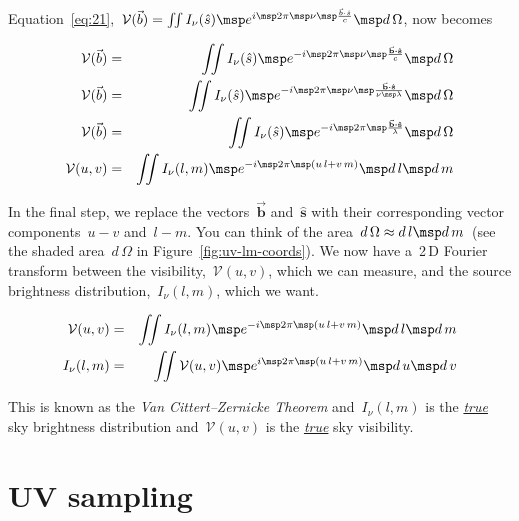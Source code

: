 Equation~\eqref{eq:21},~$\mathcal{V}(\vec{b}) = \iint I_\nu (\hat{s}) \msp e^{i \msp 2\pi \msp \nu \msp \frac{\vec{b} \cdot \hat{s}}{c}} \msp d\,\Omega $, now becomes

\begin{eqnarray}
  \label{eq:23}
  \mathcal{V}(\vec{b}) &=& \iint I_\nu (\hat{s}) \msp e^{-i \msp 2\pi \msp \nu \msp \frac{\vec{\mathbf{b}} \boldsymbol{\cdot} \mathbf{\hat{s}}}{c}} \msp d\,\Omega \nonumber \\
  \mathcal{V}(\vec{b}) &=& \iint I_\nu (\hat{s}) \msp e^{-i \msp 2\pi \msp \nu \msp \frac{\vec{\mathbf{b}} \boldsymbol{\cdot} \mathbf{\hat{s}}}{\nu \msp \lambda }} \msp d\,\Omega \nonumber \\
  \mathcal{V}(\vec{b}) &=& \iint I_\nu (\hat{s}) \msp e^{-i \msp 2\pi \msp \frac{\vec{\mathbf{b}} \boldsymbol{\cdot} \mathbf{\hat{s}}}{\lambda }} \msp d\,\Omega \nonumber \\
     \mathcal{V}(u, v) &=& \iint I_\nu (l, m) \msp e^{-i \msp 2\pi \msp (u\,l + v\,m)} \msp d\,l \msp d\,m \nonumber
\end{eqnarray}

In the final step, we replace the vectors~$\vec{\mathbf{b}}$ and~$\mathbf{\hat{s}}$ with their corresponding vector components~$u-v$ and~$l-m$. You can think of the area~$d\,\Omega \approx d\,l \msp d\,m$~(see the shaded area~$d\,\Omega $ in Figure~\ref{fig:uv-lm-coords}). We now have a~2\,D Fourier transform between the visibility,~$\mathcal{V}(u, v)$, which we can measure, and the source brightness distribution,~$I_\nu (l, m)$, which we want.

\begin{eqnarray}
  \label{eq:24}
  \begin{aligned}
  \mathcal{V}(u, v) &=& \iint I_\nu (l, m) \msp e^{-i \msp 2\pi \msp (u\,l + v\,m)} \msp d\,l \msp d\,m \\
  I_\nu (l, m) &=& \iint \mathcal{V}(u, v) \msp e^{ i \msp 2\pi \msp (u\,l + v\,m)} \msp d\,u \msp d\,v
  \end{aligned}
\end{eqnarray}

This is known as the \emph{Van Cittert--Zernicke Theorem} and~$I_\nu (l, m)$ is the \underline{\emph{true}} sky brightness distribution and~$\mathcal{V}(u, v)$ is the \underline{\emph{true}} sky visibility.

\section{UV sampling}

